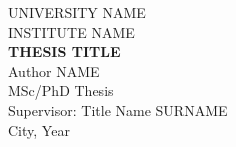 \begin{titlepage}\centering
{\large UNIVERSITY NAME}\\ {\large INSTITUTE NAME}\\[3cm]
{\LARGE\bfseries THESIS TITLE}\\[2cm]
{\large Author NAME}\\[1cm]
{\large MSc/PhD Thesis}\\[2cm]
{\large Supervisor: Title Name SURNAME}\\[1cm]
{\large City, Year}
\end{titlepage}
